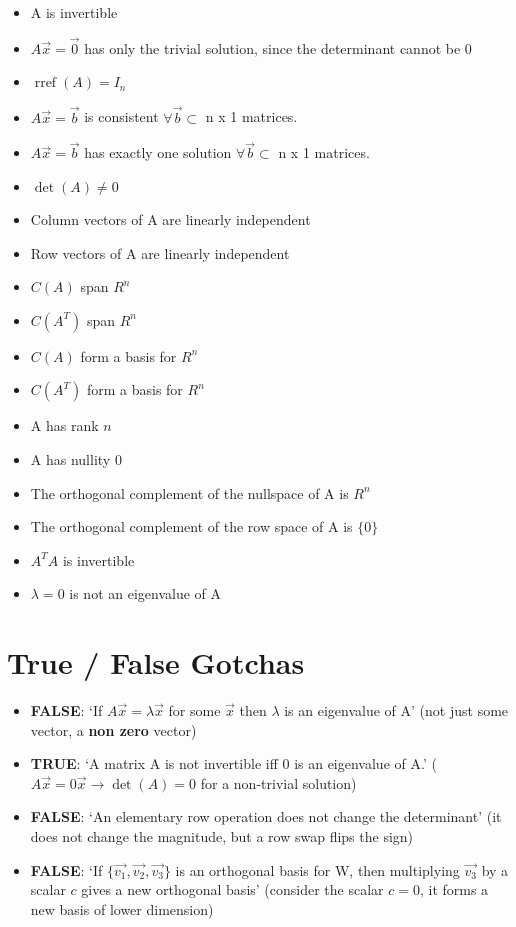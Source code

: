 \documentclass[12pt,landscape,a4paper]{article}
\DeclareMathOperator{\rref}{rref}
\begin{document}
\begin{multicols*}{3}
  \begin{itemize}
    \item A is invertible
    \item $A\vec{x} = \vec{0}$ has only the trivial solution, since the
      determinant cannot be 0
    \item $\rref (A) = I_n$
    \item $A\vec{x} = \vec{b}$ is consistent $\forall \vec{b} \subset$ n x 1 matrices.
    \item $A\vec{x} = \vec{b}$ has exactly one solution $\forall \vec{b} \subset$ n x 1 matrices.
    \item $\det(A) \neq 0$
    \item Column vectors of A are linearly independent
    \item Row vectors of A are linearly independent
    \item $C(A)$ span $R^n$
    \item $C(A^T)$ span $R^n$
    \item $C(A)$ form a basis for $R^n$
    \item $C(A^T)$ form a basis for $R^n$
    \item A has rank $n$
    \item A has nullity 0
    \item The orthogonal complement of the nullspace of A is $R^n$
    \item The orthogonal complement of the row space of A is $\{ 0 \}$
    \item $A^T A$ is invertible
    \item $\lambda = 0$ is not an eigenvalue of A
  \end{itemize}

 \section{True / False Gotchas}
 \begin{itemize}
   \item \textbf{FALSE}: `If $A\vec{x} = \lambda \vec{x}$ for some $\vec{x}$ then $\lambda$ is an
    eigenvalue of A' (not just some vector, a \textbf{non zero} vector)
  \item \textbf{TRUE}: `A matrix A is not invertible iff 0 is an eigenvalue of
    A.' ($A\vec{x} = 0\vec{x} \to \det(A) = 0$ for a non-trivial solution)
  \item \textbf{FALSE}: `An elementary row operation does not change the
    determinant' (it does not change the magnitude, but a row swap flips the
    sign)
  \item \textbf{FALSE}: `If $\{ \vec{v_1}, \vec{v_2}, \vec{v_3} \}$ is an
    orthogonal basis for W, then multiplying $\vec{v_3}$ by a scalar $c$ gives a
    new orthogonal basis' (consider the scalar $c=0$, it forms a new basis of
    lower dimension)
 \end{itemize}

\end{multicols*}
\end{document}
